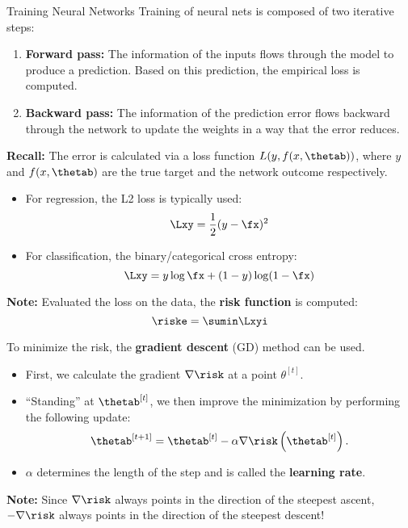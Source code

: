 






\begin{vbframe}{Training Neural Networks}
\lz
Training of neural nets is composed of two iterative steps:
\lz
\begin{enumerate}
\item \textbf{Forward pass:} The information of the inputs flows through the model to produce a prediction. Based on this prediction, the empirical loss is computed.
\lz
\item \textbf{Backward pass:} The information of the prediction error flows backward through the network to update the weights in a way that the error reduces.
\end{enumerate}
\lz

\textbf{Recall:} The error is calculated via a loss function $L(y, f(x, \thetab))$, where $y$ and $f(x, \thetab)$ are the true target and the network outcome respectively.
\framebreak

\lz
\lz
\begin{itemize}
\item For regression, the L2 loss is typically used:
$$\Lxy = \frac{1}{2}(y - \fx)^2$$
\item For classification, the binary/categorical cross entropy:
$$\Lxy = y \log \fx + (1 - y) \log(1 - \fx)$$
\end{itemize}
\lz
\lz
\textbf{Note:} Evaluated the loss on the data, the \textbf{risk function} is computed:
$$\riske = \sumin \Lxyi$$
\framebreak

\lz
To minimize the risk, the \textbf{gradient descent} (GD) method can be used.
\lz
\begin{itemize}
\item First, we calculate the gradient $\nabla \risk$ at a point $\theta^{[t]}$.
\lz
\item \enquote{Standing} at $\thetab^{[t]}$, we then improve the minimization by performing the following update:
$$\thetab^{[t + 1 ]}  = \thetab^{[t]} - \alpha \nabla \risk\left(\thetab^{[t]}\right).$$
\item $\alpha$ determines the length of the step and is called the \textbf{learning rate}.
\end{itemize}
\lz
\lz
\textbf{Note:} Since $\nabla \risk$ always points in the direction of the steepest ascent, $-\nabla \risk$ always points in the direction of the steepest descent!
\end{vbframe}

